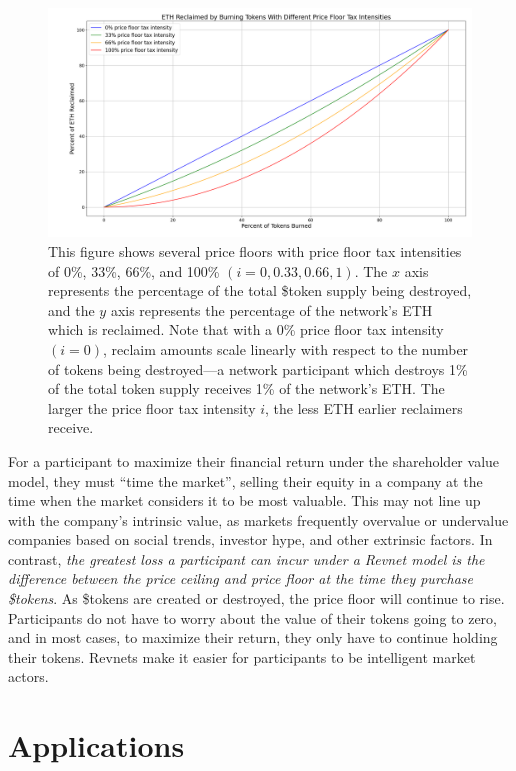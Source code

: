 \documentclass{article}
\begin{document}
\begin{figure}[ht]
  \centering
  \includegraphics[width=\textwidth]{figures/multi-floor-intensities.png}
  \caption{This figure shows several price floors with price floor tax intensities of 0\%, 33\%, 66\%, and 100\% $(i = 0, 0.33, 0.66, 1)$. The $x$ axis represents the percentage of the total \$token supply being destroyed, and the $y$ axis represents the percentage of the network's ETH which is reclaimed. Note that with a 0\% price floor tax intensity $(i = 0)$, reclaim amounts scale linearly with respect to the number of tokens being destroyed---a network participant which destroys 1\% of the total token supply receives 1\% of the network's ETH. The larger the price floor tax intensity $i$, the less ETH earlier reclaimers receive.}
\end{figure}

For a participant to maximize their financial return under the shareholder value model, they must ``time the market'', selling their equity in a company at the time when the market considers it to be most valuable. This may not line up with the company's intrinsic value, as markets frequently overvalue or undervalue companies based on social trends, investor hype, and other extrinsic factors. In contrast, \textit{the greatest loss a participant can incur under a Revnet model is the difference between the price ceiling and price floor at the time they purchase \$tokens}. As \$tokens are created or destroyed, the price floor will continue to rise. Participants do not have to worry about the value of their tokens going to zero, and in most cases, to maximize their return, they only have to continue holding their tokens. Revnets make it easier for participants to be intelligent market actors.

\section{Applications}
\end{document}

